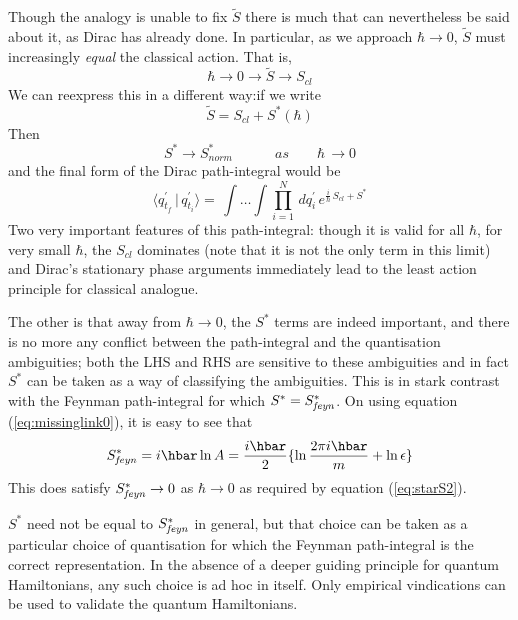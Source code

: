 \documentclass[12pt]{article}
\newcommand{\be}{\begin{equation}}
\newcommand{\ee}{\end{equation}}
\begin{document}
Though the analogy is unable to fix ${\tilde S}$ there is much that can nevertheless be said about it, as Dirac has already done. In 
particular, as we approach $\hbar \rightarrow 0$, ${\tilde S}$ must increasingly {\it equal} the classical action.  That is,
\be
\label{eq:tildeS}
\hbar \rightarrow 0 \rightarrow {\tilde S} \rightarrow S_{cl}
\ee
We can reexpress this in a different way:if we write
\be
\label{eq:starS}
{\tilde S} = S_{cl} + S^*(\hbar)
\ee
Then 
\be
\label{eq:starS2}
S^* \rightarrow  S^*_{norm} \quad\quad\quad as\quad\quad \hbar\,\rightarrow 0
\ee
and the final form of the Dirac path-integral would be
\be
\label{eq:diracpathint*}
\langle q_{t_f}^\prime\,|\,q_{t_i}^\prime \rangle  =
\, \int \ldots \int \prod_{i=1}^{N}\,dq_i^\prime\,e^{\frac{i}{\hbar}\,S_{cl} + S^*}
\ee 
Two very important features of this path-integral: though it is valid for all $\hbar$, for very small $\hbar$, the $S_{cl}$ dominates (note
that it is not the only term in this limit) and Dirac's stationary phase arguments immediately lead to the least action principle for classical
analogue.

The other is that away from $\hbar \rightarrow 0$, the $S^*$ terms are indeed important, and there is no more any conflict between the
path-integral and the quantisation ambiguities; both the LHS and RHS are sensitive to these ambiguities and in fact $S^*$ can be taken as a
way of classifying the ambiguities. This is in stark contrast with the Feynman path-integral for which $S^* = S^*_{\it feyn}$. On using
equation (\ref{eq:missinglink0}), it is easy to see that
\be
\label{eq:S*feyn} 
S^*_{\it feyn} = i \hbar \ln{A}=\frac{i\hbar}{2}\{ \ln{\frac{2 \pi i \hbar}{m}} + \ln{\epsilon}\}
\ee
This does satisfy $S^*_{\it feyn} \rightarrow 0$ as $\hbar \rightarrow 0$ as required by equation (\ref{eq:starS2}).

$S^*$ need not be equal to $S^*_{\it feyn}$ in general, but that choice can be taken as a particular choice of quantisation for which the 
Feynman path-integral is the
correct representation. In the absence of a deeper guiding principle for quantum Hamiltonians, any such choice is ad hoc in itself.
Only empirical vindications can be used to validate the quantum Hamiltonians.
\end{document}

